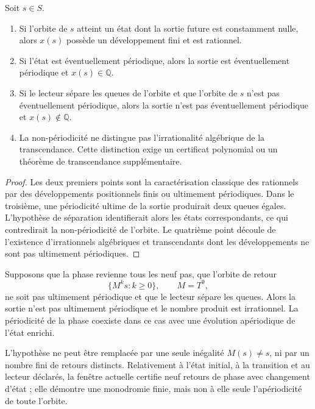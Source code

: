 \begin{theorem}
\label{thm:clasificacion-retorno-fase}
Soit \(s\in S\).
\begin{enumerate}
  \item Si l'orbite de \(s\) atteint un état dont la sortie future est
  constamment nulle, alors \(x(s)\) possède un développement fini et est
  rationnel.
  \item Si l'état est éventuellement périodique, alors la sortie est
  éventuellement périodique et \(x(s)\in\mathbb Q\).
  \item Si le lecteur sépare les queues de l'orbite et que l'orbite de \(s\) n'est pas
  éventuellement périodique, alors la sortie n'est pas éventuellement périodique
  et \(x(s)\notin\mathbb Q\).
  \item La non-périodicité ne distingue pas l’irrationalité algébrique de la
transcendance. Cette distinction exige un certificat polynomial ou un
théorème de transcendance supplémentaire.
\end{enumerate}
\end{theorem}

\begin{proof}
Les deux premiers points sont la caractérisation classique des rationnels
par des développements positionnels finis ou ultimement périodiques. Dans
le troisième, une périodicité ultime de la sortie produirait deux queues
égales. L’hypothèse de séparation identifierait alors les états
correspondants, ce qui contredirait la non-périodicité de l’orbite. Le quatrième
point découle de l’existence d’irrationnels algébriques et transcendants
dont les développements ne sont pas ultimement périodiques.
\end{proof}

\begin{corollary}
Supposons que la phase revienne tous les neuf pas, que l’orbite de retour
\[
 \{M^ks:k\geq0\},\qquad M=T^9,
\]
ne soit pas ultimement périodique et que le lecteur sépare les queues. Alors la
sortie n’est pas ultimement périodique et le nombre produit est irrationnel. La
périodicité de la phase coexiste dans ce cas avec une évolution apériodique de
l’état enrichi.
\end{corollary}

L’hypothèse ne peut être remplacée par une seule inégalité \(M(s)\ne s\), ni
par un nombre fini de retours distincts. Relativement à l’état initial,
à la transition et au lecteur déclarés, la fenêtre actuelle certifie neuf
retours de phase avec changement d’état ; elle démontre une monodromie finie, mais non
à elle seule l’apériodicité de toute l’orbite.

